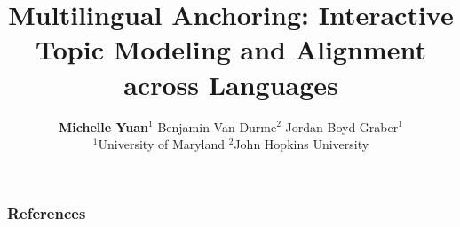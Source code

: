 \documentclass{beamer}
\title{Multilingual Anchoring: Interactive Topic Modeling and Alignment across Languages}
\author{
\small{
\textbf{Michelle Yuan}$^1$ Benjamin Van Durme$^2$  Jordan Boyd-Graber$^1$
} \\\vspace{10px}
\footnotesize{$^1$University of Maryland $^2$John Hopkins University}
}
\date{}
\begin{document}
\begin{frame}
    \titlepage
\end{frame}












\begin{frame}[t, allowframebreaks]
\frametitle{References}

\small

\end{frame}
\end{document}
